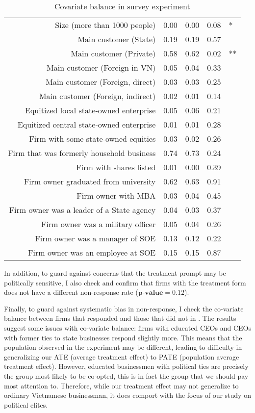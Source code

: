 \begin{table}[ht]
\begin{tabular}{rrrrl}
  Size (more than 1000 people) & 0.00 & 0.00 & 0.08 & * \\ 
  Main customer (State) & 0.19 & 0.19 & 0.57 &  \\ 
  Main customer (Private) & 0.58 & 0.62 & 0.02 & ** \\ 
  Main customer (Foreign in VN) & 0.05 & 0.04 & 0.33 &  \\ 
  Main customer (Foreign, direct) & 0.03 & 0.03 & 0.25 &  \\ 
  Main customer (Foreign, indirect) & 0.02 & 0.01 & 0.14 &  \\ 
  Equitized local state-owned enterprise & 0.05 & 0.06 & 0.21 &  \\ 
  Equitized central state-owned enterprise & 0.01 & 0.01 & 0.28 &  \\ 
  Firm with some state-owned equities & 0.03 & 0.02 & 0.26 &  \\ 
  Firm that was formerly household business & 0.74 & 0.73 & 0.24 &  \\ 
  Firm with shares listed & 0.01 & 0.00 & 0.39 &  \\ 
  Firm owner graduated from university & 0.62 & 0.63 & 0.91 &  \\ 
  Firm owner with MBA & 0.03 & 0.04 & 0.45 &  \\ 
  Firm owner was a leader of a State agency & 0.04 & 0.03 & 0.37 &  \\ 
  Firm owner was a military officer & 0.05 & 0.04 & 0.26 &  \\ 
  Firm owner was a manager of SOE & 0.13 & 0.12 & 0.22 &  \\ 
  Firm owner was an employee at SOE & 0.15 & 0.15 & 0.87 &  \\ 
   \hline
\end{tabular}
\caption{Covariate balance in survey experiment}
\label{tab:balance}
\end{table}

In addition, to guard against concerns that the treatment prompt may be politically sensitive, I also check and confirm that firms with the treatment form does not have a different non-response rate ($\textbf{p-value} = 0.12$).

Finally, to guard against systematic bias in non-response, I check the co-variate balance between firms that responded and those that did not in . The results suggest some issues with co-variate balance: firms with educated CEOs and CEOs with former ties to state businesses respond slightly more. This means that the population observed in the experiment may be different, leading to difficulty in generalizing our ATE (average treatment effect) to PATE (population average treatment effect). However, educated businessmen with political ties are precisely the group most likely to be co-opted, this is in fact the group that we should pay most attention to. Therefore, while our treatment effect may not generalize to ordinary Vietnamese businessman, it does comport with the focus of our study on political elites.

